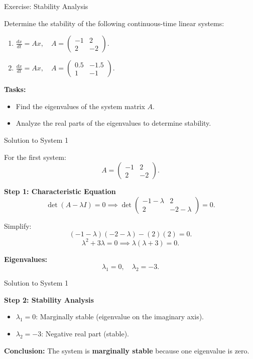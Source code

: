 \documentclass{beamer}
\begin{document}
\begin{frame}{Exercise: Stability Analysis}

Determine the stability of the following continuous-time linear systems:

\begin{enumerate}
    \item \( \frac{dx}{dt} = A x, \quad A = \begin{pmatrix} -1 & 2 \\ 2 & -2 \end{pmatrix}. \)
    \item \( \frac{dx}{dt} = A x, \quad A = \begin{pmatrix} 0.5 & -1.5 \\ 1 & -1 \end{pmatrix}. \)
\end{enumerate}

\textbf{Tasks:}
\begin{itemize}
    \item Find the eigenvalues of the system matrix \( A \).
    \item Analyze the real parts of the eigenvalues to determine stability.
\end{itemize}

\end{frame}

\begin{frame}{Solution to System 1}

For the first system:
\[
A = \begin{pmatrix} -1 & 2 \\ 2 & -2 \end{pmatrix}.
\]

\textbf{Step 1: Characteristic Equation}
\[
\det(A - \lambda I) = 0 \implies 
\det \begin{pmatrix} -1 - \lambda & 2 \\ 2 & -2 - \lambda \end{pmatrix} = 0.
\]

Simplify:
\[
(-1 - \lambda)(-2 - \lambda) - (2)(2) = 0.
\]
\[
\lambda^2 + 3\lambda = 0 \implies \lambda (\lambda + 3) = 0.
\]

\textbf{Eigenvalues:}
\[
\lambda_1 = 0, \quad \lambda_2 = -3.
\]

\end{frame}
\begin{frame}{Solution to System 1}

\textbf{Step 2: Stability Analysis}
\begin{itemize}
    \item \( \lambda_1 = 0 \): Marginally stable (eigenvalue on the imaginary axis).
    \item \( \lambda_2 = -3 \): Negative real part (stable).
\end{itemize}

\textbf{Conclusion:} The system is \textbf{marginally stable} because one eigenvalue is zero.

\end{frame}
\end{document}
